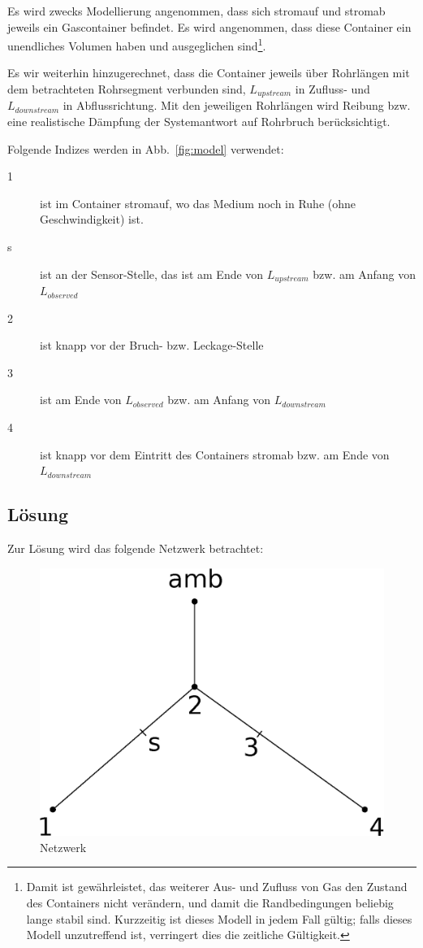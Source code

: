 \documentclass[a4paper,10pt,twocolumn]{article}
\begin{document}
Es wird zwecks Modellierung angenommen, dass sich stromauf und stromab jeweils ein Gascontainer befindet. Es wird angenommen, dass diese Container ein unendliches Volumen haben und ausgeglichen sind\footnote{Damit ist gewährleistet, das weiterer Aus- und Zufluss von Gas den Zustand des Containers nicht verändern, und damit die Randbedingungen beliebig lange stabil sind. Kurzzeitig ist dieses Modell in jedem Fall gültig; falls dieses Modell unzutreffend ist, verringert dies die zeitliche Gültigkeit.}.

Es wir weiterhin hinzugerechnet, dass die Container jeweils über Rohrlängen mit dem betrachteten Rohrsegment verbunden sind, $L_\mathit{upstream}$ in Zufluss- und $L_\mathit{downstream}$ in Abflussrichtung. Mit den jeweiligen Rohrlängen wird Reibung bzw. eine realistische Dämpfung der Systemantwort auf Rohrbruch berücksichtigt.

Folgende Indizes werden in Abb.~\ref{fig:model} verwendet:

\begin{description}
\item[1] ist im Container stromauf, wo das Medium noch in Ruhe (ohne Geschwindigkeit) ist.
\item[s] ist an der Sensor-Stelle, das ist am Ende von $L_\mathit{upstream}$ bzw. am Anfang von $L_\mathit{observed}$
\item[2] ist knapp vor der Bruch- bzw. Leckage-Stelle
\item[3] ist am Ende von $L_\mathit{observed}$ bzw. am Anfang von $L_\mathit{downstream}$
\item[4] ist knapp vor dem Eintritt des Containers stromab bzw. am Ende von $L_\mathit{downstream}$
\end{description}

\subsection{Lösung}

Zur Lösung wird das folgende Netzwerk betrachtet:

\begin{figure}[hbp]
\centering
\includegraphics[width=0.9\hsize]{netz.eps}
\caption{Netzwerk}
\label{fig:netz}
\end{figure}
\end{document}
